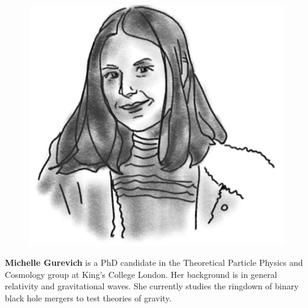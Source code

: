 \begin{figure}
\vspace{-1.5\intextsep}
\includegraphics[width=0.9\linewidth]{portraits/michelle.png}
\end{figure}
\textbf{Michelle Gurevich} is a PhD candidate in the Theoretical Particle Physics and Cosmology group at King's College London. Her background is in general relativity and gravitational waves. She currently studies the ringdown of binary black hole mergers to test theories of gravity.\\
\\

\vspace{-10pt}

